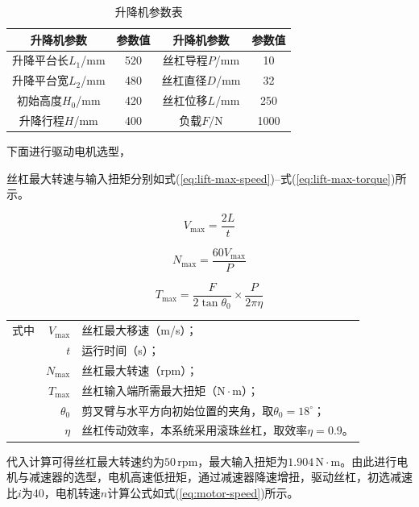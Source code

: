 \begin{table}[htbp]
  \caption{升降机参数表}\label{tab:lift-parameters}
\vspace{0.5em}\centering\wuhao
\begin{tabular}{cccc}
\toprule
升降机参数 & 参数值 & 升降机参数 & 参数值 \\
\midrule
升降平台长$L_1$/mm & 520 & 丝杠导程$P$/mm & 10 \\
升降平台宽$L_2$/mm & 480 & 丝杠直径$D$/mm & 32 \\
初始高度$H_0$/mm & 420 & 丝杠位移$L$/mm & 250 \\
升降行程$H$/mm & 400 & 负载$F$/N & 1000 \\
\bottomrule
\end{tabular}
\end{table}

下面进行驱动电机选型，

丝杠最大转速与输入扭矩分别如式(\ref{eq:lift-max-speed})--式(\ref{eq:lift-max-torque})所示。

\begin{equation}\label{eq:lift-max-speed}
V_{\max}=\frac{2L}{t}
\end{equation}

\begin{equation}\label{eq:lift-max-rotation}
N_{\max}=\frac{60V_{\max}}{P}
\end{equation}

\begin{equation}\label{eq:lift-max-torque}
T_{\max}=\frac{F}{2\tan\theta_0}\times\frac{P}{2\pi\eta}
\end{equation}

\noindent\begin{tabularx}{\textwidth}{@{}l@{\quad}r@{———}X@{}}
式中& $V_{\max}$ &丝杠最大移速（m/s）；\\
& $t$ &运行时间（s）；\\
& $N_{\max}$ &丝杠最大转速（rpm）；\\
& $T_{\max}$ &丝杠输入端所需最大扭矩（$\mathrm{N\cdot m}$）；\\
& $\theta_0$ &剪叉臂与水平方向初始位置的夹角，取$\theta_0=18^\circ$；\\
& $\eta$ &丝杠传动效率，本系统采用滚珠丝杠，取效率$\eta=0.9$。
\end{tabularx}\vspace{3.15bp}

代入计算可得丝杠最大转速约为$50\,\mathrm{rpm}$，最大输入扭矩为$1.904\,\mathrm{N\cdot m}$。由此进行电机与减速器的选型，电机高速低扭矩，通过减速器降速增扭，驱动丝杠，初选减速比$i$为40，电机转速$n$计算公式如式(\ref{eq:motor-speed})所示。

